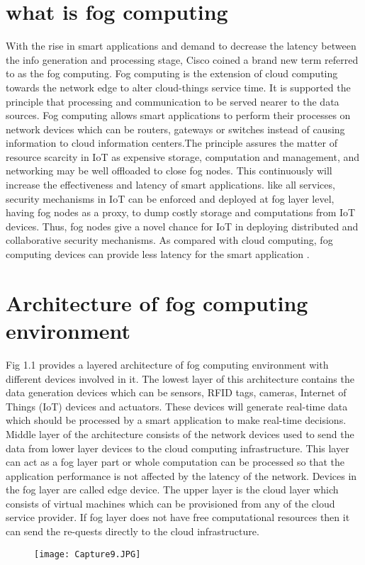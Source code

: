\section{what is fog computing}
With the rise in smart applications and demand to decrease the latency between the info generation
and processing stage, Cisco coined a brand new term referred to as the fog computing. Fog computing
is the extension of cloud computing towards the network edge to alter cloud-things service time.
It is supported the principle that processing and communication  to be served nearer to the
data sources. Fog computing allows smart applications to perform their processes on network devices which can be routers, gateways or switches instead of causing information to cloud information centers.The principle assures the matter of resource scarcity in IoT as expensive storage, computation and management, and networking may be well offloaded to close fog nodes. This continuously will increase the effectiveness and latency of smart applications. like all services, security mechanisms in IoT can be enforced and deployed at fog layer level, having fog nodes as a proxy, to dump costly storage and computations from IoT devices. Thus, fog nodes give a novel chance for IoT in deploying distributed and collaborative security mechanisms. As compared with cloud computing, fog computing devices can provide less latency for the smart application .
\section{Architecture of fog computing environment}

Fig 1.1 provides a layered architecture of fog computing environment with different devices involved in it. The lowest layer of this architecture contains the data generation devices which can be sensors, RFID tags, cameras, Internet of Things (IoT) devices and actuators. These devices will generate real-time data which should be processed by a smart application to make real-time decisions. Middle layer of the architecture consists of the network devices used to send the data from lower layer devices to the cloud computing infrastructure. This layer can act as a fog layer part or whole computation can be processed so that the application performance is not affected by the latency of the network. Devices in the fog layer are called edge device.
The upper layer is the cloud layer which consists of virtual machines which can be provisioned from any of the cloud service provider. If fog layer does not have free computational resources then it can send the re-quests directly to the cloud infrastructure.
\begin{figure}[h]
	\texttt{[image: Capture9.JPG]}
	\caption{}
	\label{fig:boat1}
\end{figure}
